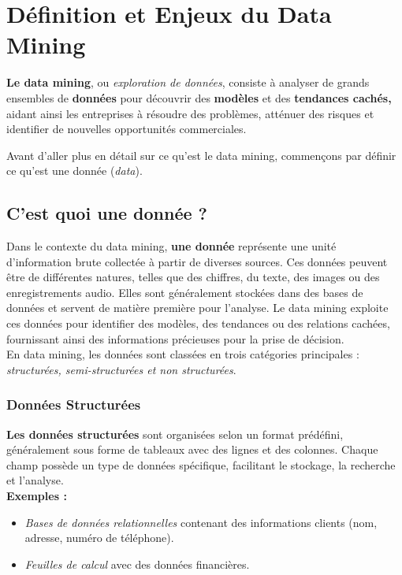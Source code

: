 \documentclass[a4paper,12pt]{report}
\begin{document}
\chapter{Définition et Enjeux du Data Mining}
\textbf{Le data mining}, ou \textit{exploration de données}, consiste à analyser de grands ensembles de \textbf{données} pour découvrir des \textbf{modèles} et des \textbf{tendances cachés,} aidant ainsi les entreprises à résoudre des problèmes, atténuer des risques et identifier de nouvelles opportunités commerciales.

Avant d’aller plus en détail sur ce qu’est le data mining, commençons par définir ce qu’est une donnée (\textit{data}). \\


    \section{C'est quoi une donnée ?}
        Dans le contexte du data mining, \textbf{une donnée} représente une unité d'information brute collectée à partir de diverses sources. Ces données peuvent être de différentes natures, telles que des chiffres, du texte, des images ou des enregistrements audio. Elles sont généralement stockées dans des bases de données et servent de matière première pour l'analyse. Le data mining exploite ces données pour identifier des modèles, des tendances ou des relations cachées, fournissant ainsi des informations précieuses pour la prise de décision.\\

        En data mining, les données sont classées en trois catégories principales : \textit{structurées, semi-structurées et non structurées}. \\

        \subsection{Données Structurées}
            \textbf{Les données structurées} sont organisées selon un format prédéfini, généralement sous forme de tableaux avec des lignes et des colonnes. Chaque champ possède un type de données spécifique, facilitant le stockage, la recherche et l'analyse.\\

            \textbf{Exemples :}
            \begin{itemize}
                \item \textit{Bases de données relationnelles} contenant des informations clients (nom, adresse, numéro de téléphone).
                \item \textit{Feuilles de calcul} avec des données financières.
            \end{itemize}
            
\end{document}

